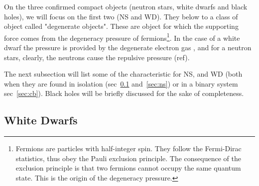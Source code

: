 On the three confirmed compact objects (neutron stars, white dwarfs and black holes), we will focus on the first two (NS and WD). They below to a class of object called "degenerate objects". These are object for which the supporting force comes from the degeneracy pressure of fermions\footnote{Fermions are particles with half-integer spin. They follow the Fermi-Dirac statistics, thus obey the Pauli exclusion principle. The consequence of the exclusion principle is that two fermions cannot occupy the same quantum state. This is the origin of the degeneracy pressure. }. In the case of a white dwarf the pressure is provided by the degenerate electron gas \citep{fowler_dense_1926}, and for a neutron stars, clearly, the neutrons cause the repulsive pressure (ref). 

The next subsection will list some of the characteristic for NS, and WD (both when they are found in isolation (sec~\ref{sec:wd} and~\ref{sec:ns}) or in a binary system sec~\ref{sec:cb}). Black holes will be briefly discussed for the sake of completeness. 



\subsection[White Dwarfs]{White Dwarfs}\label{sec:wd} 

